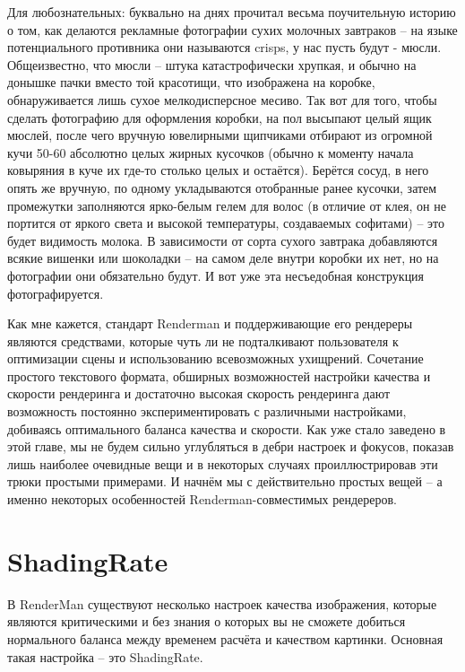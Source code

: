  Для
    любознательных: буквально на днях
    прочитал весьма поучительную историю о том, как делаются рекламные
    фотографии сухих молочных завтраков – на языке потенциального
    противника они называются crisps, у нас пусть будут - мюсли.
    Общеизвестно, что мюсли – штука катастрофически хрупкая, и обычно
    на донышке пачки вместо той красотищи, что изображена на коробке,
    обнаруживается лишь сухое мелкодисперсное месиво. Так вот для того,
    чтобы сделать фотографию для оформления коробки, на пол высыпают
    целый ящик мюслей, после чего вручную ювелирными щипчиками отбирают
    из огромной кучи 50-60 абсолютно целых жирных кусочков (обычно к
    моменту начала ковыряния в куче их где-то столько целых и
    остаётся). Берётся сосуд, в него опять же вручную, по одному
    укладываются отобранные ранее кусочки, затем промежутки заполняются
    ярко-белым гелем для волос (в отличие от клея, он не портится от
    яркого света и высокой температуры, создаваемых софитами) – это
    будет видимость молока. В зависимости от сорта сухого завтрака
    добавляются всякие вишенки или шоколадки – на самом деле внутри
    коробки их нет, но на фотографии они обязательно будут. И вот уже
    эта несъедобная конструкция фотографируется.
  

 Как мне кажется, стандарт Renderman и
    поддерживающие его рендереры являются средствами, которые чуть ли
    не подталкивают пользователя к оптимизации сцены и использованию
    всевозможных ухищрений. Сочетание простого текстового формата,
    обширных возможностей настройки качества и скорости рендеринга и
    достаточно высокая скорость рендеринга дают возможность постоянно
    экспериментировать с различными настройками, добиваясь оптимального
    баланса качества и скорости. Как уже стало заведено в этой главе,
    мы не будем сильно углубляться в дебри настроек и фокусов, показав
    лишь наиболее очевидные вещи и в некоторых случаях проиллюстрировав
    эти трюки простыми примерами.\hfil\break
    И начнём мы с действительно простых вещей – а именно некоторых
    особенностей Renderman-совместимых рендереров.
  \chapter*{ShadingRate}
  

 В RenderMan существуют несколько настроек качества
    изображения, которые являются критическими и без знания о которых
    вы не сможете добиться нормального баланса между временем расчёта и
    качеством картинки. Основная такая настройка – это
    ShadingRate.
  

